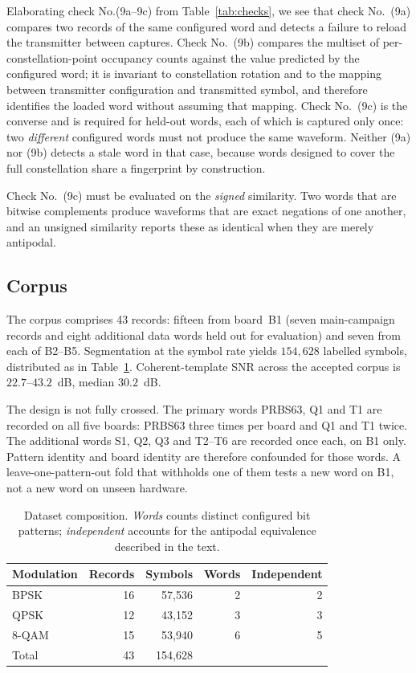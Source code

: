 \documentclass{ieeeaccess}
\begin{document}
Elaborating check No.(9a--9c) from Table~\ref{tab:checks}, we see that check No.~(9a) compares two records of the same
configured word and detects a failure to reload the transmitter between
captures. Check No.~(9b) compares the multiset of per-constellation-point occupancy
counts against the value predicted by the configured word; it is invariant to
constellation rotation and to the mapping between transmitter configuration and
transmitted symbol, and therefore identifies the loaded word without assuming
that mapping. Check No.~(9c) is the converse and is required for held-out words, each
of which is captured only once: two \emph{different} configured words must not
produce the same waveform. Neither (9a) nor (9b) detects a stale word in that case,
because words designed to cover the full constellation share a fingerprint by
construction.

Check No.~(9c) must be evaluated on the \emph{signed} similarity. Two words that are
bitwise complements produce waveforms that are exact negations of one another,
and an unsigned similarity reports these as identical when they are merely
antipodal.

\subsection{Corpus}
The corpus comprises 43 records: fifteen from board~B1 (seven main-campaign
records and eight additional data words held out for evaluation) and seven from
each of B2--B5. Segmentation at the symbol rate yields $154{,}628$ labelled
symbols, distributed as in Table~\ref{tab:dataset}. Coherent-template SNR across
the accepted corpus is $22.7$--$43.2$~dB, median $30.2$~dB.

The design is not fully crossed. The primary words PRBS63, Q1 and T1 are
recorded on all five boards: PRBS63 three times per board and Q1 and T1 twice.
The additional words S1, Q2, Q3 and T2--T6 are recorded once each, on B1 only.
Pattern identity and board identity are therefore confounded for those words.
A leave-one-pattern-out fold that withholds one of them tests a new word on
B1, not a new word on unseen hardware.

\begin{table}[!t]
\caption{Dataset composition. \emph{Words} counts distinct configured bit
patterns; \emph{independent} accounts for the antipodal equivalence described in the text.
}
\label{tab:dataset}
\centering
\begin{tabular}{lrrrr}
\toprule
Modulation & Records & Symbols & Words & Independent \\
\midrule
BPSK  & 16 & 57{,}536 & 2 & 2 \\
QPSK  & 12 & 43{,}152 & 3 & 3 \\
8-QAM & 15 & 53{,}940 & 6 & 5 \\
\midrule
Total & 43 & 154{,}628 & & \\
\bottomrule
\end{tabular}
\end{table}
\end{document}
